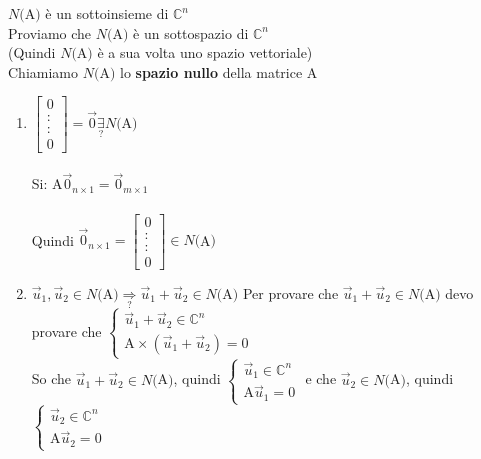 $N($A$)$ è un sottoinsieme di $\mathbb{C}^n$\\
Proviamo che $N($A$)$ è un sottospazio di $\mathbb{C}^n$\\
(Quindi $N($A$)$ è a sua volta uno spazio vettoriale) \\
Chiamiamo $N($A$)$ lo \textbf{spazio nullo} della matrice A 
\begin{enumerate}
    \item $ 
        \begin{bmatrix}
            0\\
            :\\
            :\\
            0
        \end{bmatrix}
        =\vec{0}\underset{?}{\exists} N($A$)$\\\\
        Si: A$\vec{0}_{n\times 1}=\vec{0}_{m\times 1}$\\\\
        Quindi $\vec{0}_{n\times 1}= 
        \begin{bmatrix}
            0\\
            :\\
            :\\
            0
        \end{bmatrix}
        \in N($A$)$
    \item $\vec{u}_1, \vec{u}_2\in N($A$) \underset{?}{\Longrightarrow}
        \vec{u}_1+\vec{u}_2\in N($A$)$
        Per provare che $\vec{u}_1+\vec{u}_2\in N($A$)$ devo provare che 
        $
        \begin{cases}
            \vec{u}_1+\vec{u}_2\in\mathbb{C}^n\\
            \textrm{A}\times (\vec{u}_1+\vec{u}_2)=0
        \end{cases}
        $\\
        So che $\vec{u}_1+\vec{u}_2\in N($A$)$, quindi 
        $ 
        \begin{cases}
            \vec{u}_1\in\mathbb{C}^n\\
            \textrm{A} \vec{u}_1=0
        \end{cases}
        $ 
        e che $\vec{u}_2\in N($A$)$, quindi 
        $ 
        \begin{cases}
            \vec{u}_2\in\mathbb{C}^n\\
            \textrm{A} \vec{u}_2=0
        \end{cases}
        $ \\\\

\end{enumerate}
